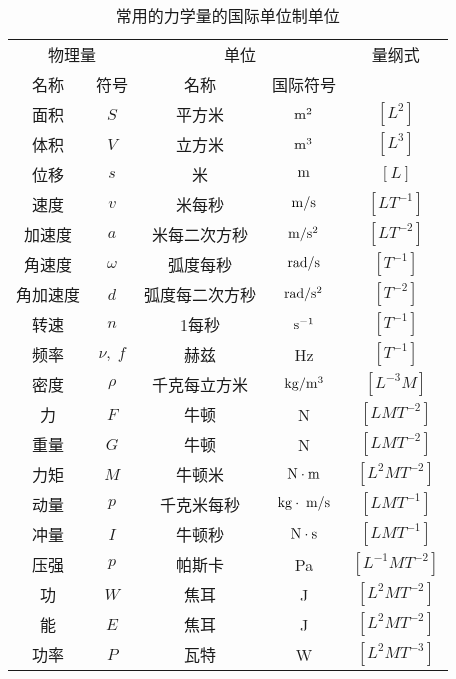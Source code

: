 \begin{table}[htbp]
	\centering
    \begin{tabular}{cc|cc|c}
        \hline
        \multicolumn{2}{c}{物理量}     & \multicolumn{2}{|c|}{单位}& 量纲式\\
        名称 & 符号 & 名称 & 国际符号 &\\
        \hline
        面积    &  $S$    &  平方米    & ${\rm m}^2$ & $[L^2]$ \\
        体积   &  $V$    &   立方米   &  ${\rm m}^3$ &$[L^3]$\\
        位移   &  $s$    &   米   &  ${\rm m}$ &$[L]$\\
        速度   &   $v$   &    米每秒  & ${\rm m}/{\rm s}$ &$[LT^{-1}]$  \\
        加速度   &  $a$    & 米每二次方秒     &  ${\rm m}/{\rm s^2}$ & $[LT^{-2}]$\\
        角速度   &  $\omega$    &  弧度每秒    & ${\rm rad}/{\rm s}$ & $[T^{-1}]$ \\
        角加速度   &  $d$    &   弧度每二次方秒   &  ${\rm rad}/{\rm s^2}$ & $[T^{-2}]$\\
        转速   &   $n$   &   1每秒   &  ${\rm s}^{-1}$ & $[T^{-1}]$\\
        频率   &  $\nu,\; f$    &  赫兹    &  Hz & $[T^{-1}]$\\
        密度   &  $\rho$    &  千克每立方米    & ${\rm kg}/{\rm m^3}$  &$[L^{-3}M]$ \\
        力   &  $F$    &  牛顿    &  N &$[LMT^{-2}]$\\
        重量   &  $G$    &    牛顿  & N  &$[LMT^{-2}]$\\
        力矩   &  $M$    &    牛顿米  & ${\rm N}\cdot {\rm m}$  & $[L^2MT^{-2}]$\\
        动量   &  $p$    & 千克米每秒     &  ${\rm kg}\cdot {\;\text{m}/\text{s}}$ &$[LMT^{-1}]$\\
        冲量   &  $I$    &  牛顿秒    &   ${\rm N}\cdot {\rm s}$&$[LMT^{-1}]$\\
        压强   &  $p$    &   帕斯卡   &  Pa & $[L^{-1}MT^{-2}]$\\
        功   &  $W$    &   焦耳   &  J & $[L^2MT^{-2}]$\\
        能   &   $E$   &   焦耳   &  J & $[L^2MT^{-2}]$\\
        功率   &  $P$    &  瓦特    & W &$[L^2MT^{-3}]$ \\
        \hline
    \end{tabular}
     \caption{常用的力学量的国际单位制单位}\label{tab_A_10-5}
\end{table}





